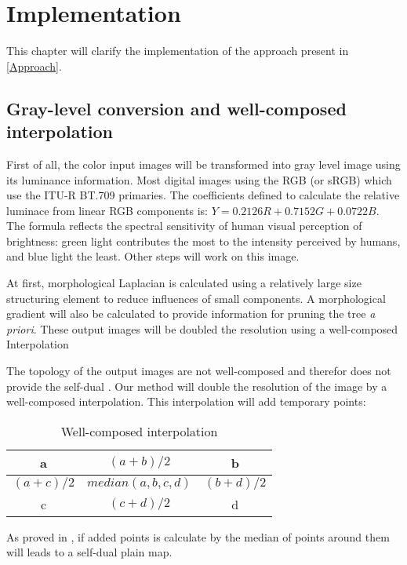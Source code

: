
\graphicspath{ {5chapterImplementation/image/} }
\chapter{Implementation}

This chapter will clarify the implementation of the approach present in \autoref{Approach}. 
\section{Gray-level conversion and well-composed interpolation}
First of all, the color input images will be transformed into gray level image using its luminance information. Most digital images using the RGB (or sRGB) which use the ITU-R BT.709 primaries. The coefficients defined to calculate the relative luminace from linear RGB components is: $Y = 0.2126R + 0.7152G + 0.0722B$. The formula reflects the spectral sensitivity of human visual perception of brightness: green light contributes the most to the intensity perceived by humans, and blue light the least. Other steps will work on this image. 
\par At first, morphological Laplacian is calculated using a relatively large size structuring element to reduce influences of small components. A morphological gradient will also be calculated to provide information for pruning the tree \textit{a priori}. These output images will be doubled the resolution using a well-composed Interpolation 

\par The topology of the output images are not well-composed and therefor does not provide the self-dual . Our method will double the resolution of the image by a well-composed interpolation. This interpolation will add temporary points:
\par
\begin{table}
	\centering
	\begin{tabular}{|c|c|c|}
	\hline 
	a & ${(a+b)}/{2}$ & b \\ 
	\hline 
	${(a+c)}/{2}$ & $median(a,b,c,d)$ & ${(b+d)}/{2}$ \\ 
	\hline 
	c & ${(c+d)}/{2}$ & d \\ 
	\hline 

	\end{tabular}
	\caption{Well-composed interpolation} 
\end{table}

\par
As proved in \cite{geraud.15.ismm}, if added points is calculate by the median of points around them will leads to a self-dual plain map.


